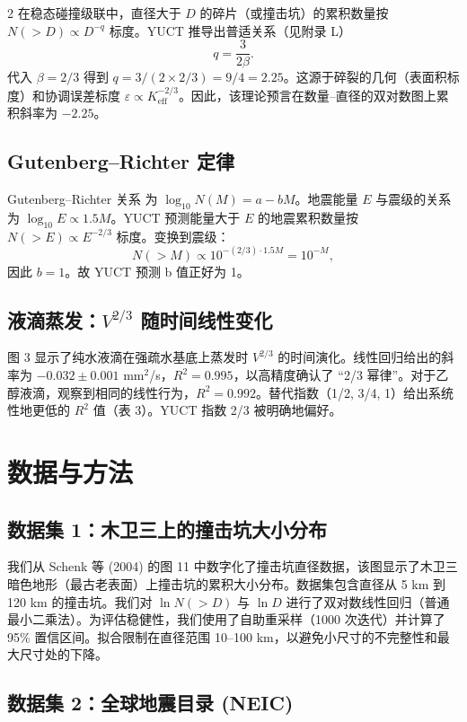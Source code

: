 \documentclass[11pt,a4paper]{article}
\newcommand{\eps}{\varepsilon}
\newcommand{\Keff}{K_{\mathrm{eff}}}
\newcommand{\betaf}{\beta}
\begin{document}
\begin{multicols}{2}
		在稳态碰撞级联中，直径大于 \(D\) 的碎片（或撞击坑）的累积数量按 \(N(>D) \propto D^{-q}\) 标度。YUCT 推导出普适关系（见附录 L）
		\[
		q = \frac{3}{2\betaf}.
		\]
		代入 \(\betaf = 2/3\) 得到 \(q = 3/(2 \times 2/3) = 9/4 = 2.25\)。这源于碎裂的几何（表面积标度）和协调误差标度 \(\eps \propto \Keff^{-2/3}\)。因此，该理论预言在数量–直径的双对数图上累积斜率为 \(-2.25\)。
		
		\subsection{Gutenberg–Richter 定律}
		
		Gutenberg–Richter 关系 \cite{GutenbergRichter1954} 为 \(\log_{10} N(M) = a - b M\)。地震能量 \(E\) 与震级的关系为 \(\log_{10} E \propto 1.5 M\)。YUCT 预测能量大于 \(E\) 的地震累积数量按 \(N(>E) \propto E^{-2/3}\) 标度。变换到震级：
		\[
		N(>M) \propto 10^{-(2/3) \cdot 1.5 M} = 10^{-M},
		\]
		因此 \(b = 1\)。故 YUCT 预测 b 值正好为 1。
		
		\subsection{液滴蒸发：\(V^{2/3}\) 随时间线性变化}
		
		图 3 显示了纯水液滴在强疏水基底上蒸发时 \(V^{2/3}\) 的时间演化。线性回归给出的斜率为 \(-0.032 \pm 0.001\) mm\(^2\)/s，\(R^2 = 0.995\)，以高精度确认了 “2/3 幂律”。对于乙醇液滴，观察到相同的线性行为，\(R^2 = 0.992\)。替代指数（1/2, 3/4, 1）给出系统性地更低的 \(R^2\) 值（表 3）。YUCT 指数 2/3 被明确地偏好。
		
		\section{数据与方法}
		
		\subsection{数据集 1：木卫三上的撞击坑大小分布}
		
		我们从 Schenk 等 (2004) \cite{Schenk2004} 的图 11 中数字化了撞击坑直径数据，该图显示了木卫三暗色地形（最古老表面）上撞击坑的累积大小分布。数据集包含直径从 5 km 到 120 km 的撞击坑。我们对 \(\ln N(>D)\) 与 \(\ln D\) 进行了双对数线性回归（普通最小二乘法）。为评估稳健性，我们使用了自助重采样（1000 次迭代）并计算了 95\% 置信区间。拟合限制在直径范围 10–100 km，以避免小尺寸的不完整性和最大尺寸处的下降。
		
		\subsection{数据集 2：全球地震目录 (NEIC)}
		

\end{multicols}
\end{document}
